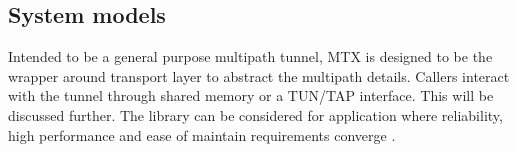 \subsection{System models}
Intended to be a general purpose multipath tunnel, \ac{MTX} is designed to be the wrapper around transport layer to abstract the multipath details.
Callers interact with the tunnel through shared memory or a TUN/TAP interface. This will be discussed further.
The library can be considered for application where reliability, high performance and ease of maintain requirements converge .










